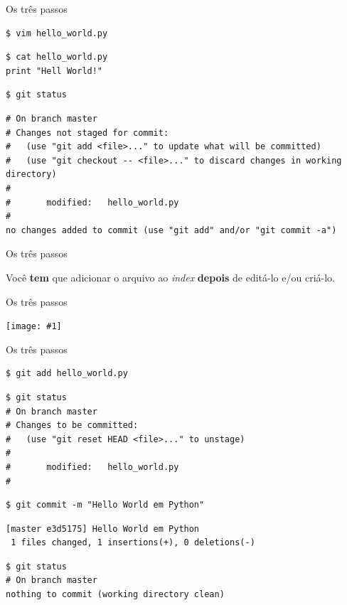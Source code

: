 \documentclass[portuguese,brazil]{beamer}
\newcommand\singlephrase[1]{
  \begin{center}
    \huge #1
  \end{center}
}
\newcommand\img[1]{
  \begin{center}
    \texttt{[image: \#1]}
  \end{center}
}
\begin{document}
\begin{frame}[fragile]{Os três passos}
\small{
\begin{verbatim}
$ vim hello_world.py
\end{verbatim}
\pause
\begin{verbatim}
$ cat hello_world.py
print "Hell World!"
\end{verbatim}
\pause
\begin{verbatim}
$ git status
\end{verbatim}
\pause
\tiny{
\begin{verbatim}
# On branch master
# Changes not staged for commit:
#   (use "git add <file>..." to update what will be committed)
#   (use "git checkout -- <file>..." to discard changes in working directory)
#
#       modified:   hello_world.py
#
no changes added to commit (use "git add" and/or "git commit -a")
\end{verbatim}
}
}
\end{frame}

\begin{frame}{Os três passos}
\singlephrase{Você \textbf{tem} que adicionar o arquivo ao \textit{index} \textbf{depois}
de editá-lo e/ou criá-lo.}
\end{frame}

\begin{frame}{Os três passos}
  \img{images/staginandcommit.pdf}
\end{frame}

\begin{frame}[fragile]{Os três passos}
\small{
\begin{verbatim}
$ git add hello_world.py
\end{verbatim}
\pause
\begin{verbatim}
$ git status
# On branch master
# Changes to be committed:
#   (use "git reset HEAD <file>..." to unstage)
#
#       modified:   hello_world.py
#
\end{verbatim}
\pause
\begin{verbatim}
$ git commit -m "Hello World em Python"
\end{verbatim}
\pause
\begin{verbatim}
[master e3d5175] Hello World em Python
 1 files changed, 1 insertions(+), 0 deletions(-)
\end{verbatim}
\pause
\begin{verbatim}
$ git status
# On branch master
nothing to commit (working directory clean)
\end{verbatim}
}
\end{frame}
\end{document}

